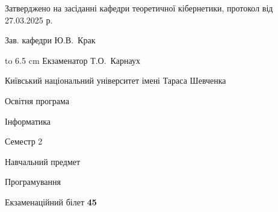 \documentclass[12pt, ukrainian]{article}
\begin{document}
{\smallskip\smallskip \begin {scriptsize} Затверджено на засіданні кафедри теоретичної кібернетики, протокол   від   27.03.2025 р.\par\smallskip\smallskip\smallskip\smallskip
{\parbox {6.5 cm} {Зав. кафедри \dotfill Ю.В.~Крак}}\hspace {0.7cm} {\hbox to 6.5 cm { Екзаменатор \dotfill Т.О.~Карнаух}} \end{scriptsize}}
\newpage
{{\begin {scriptsize}\par
{ \center  Київський національний університет імені Тараса Шевченка \par}
{\parbox {5 cm}{Освітня програма \hfill}{\parbox {7 cm}{Інформатика\hfill}}\parbox {6 cm}{\hfill Семестр 2}}\par
{\parbox {5 cm} {Навчальний предмет \hfill}\parbox {7 cm}{Програмування \hfill}\parbox {6cm}{\hfill}\par}\vspace{-15pt} \end{scriptsize}}{\center Екзаменаційний білет \No \textbf { 45 }\par}}
\end{document}
